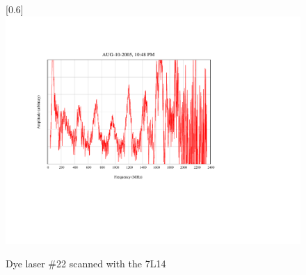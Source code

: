 \begin{figure}
\scalebox{0.8}[0.6]{
\includegraphics[viewport=150 200 300 450, bb=85 160 300 550]
{22-14/22-14.pdf}
}
\caption{Dye laser \#22 scanned with the 7L14}
\label{22-14}
\end{figure}

